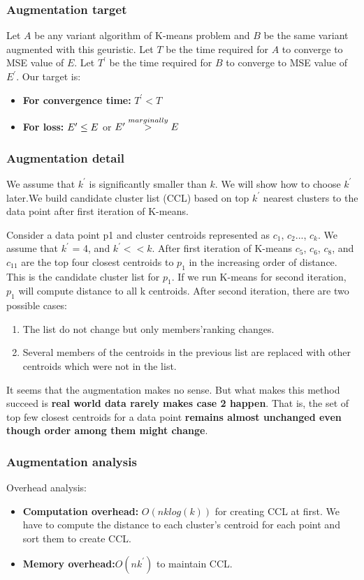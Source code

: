 \documentclass[11pt]{article}
\begin{document}
\subsubsection{Augmentation target}
Let $A$ be any variant algorithm of K-means problem and $B$ be the same variant augmented with this geuristic. Let $T$ be the time required for $A$ to converge to MSE value of $E$. Let $T^{\prime}$ be the time required for $B$ to converge to MSE value of $E^{\prime}$. Our target is:
\begin{itemize}
\item \textbf{For convergence time:} $T^{\prime} < T$
\item \textbf{For loss:} $E^{\prime} \le E \space $ or $ \space E^{\prime} \overset{marginally}{>} E$
\end{itemize}

\subsubsection{Augmentation detail}
\par We assume that $k^{\prime}$ is significantly smaller than $k$. We will show how to choose $k^{\prime}$ later.We build candidate cluster list (CCL) based on top $k^{\prime}$ nearest clusters to the data point after first iteration of K-means. \par

Consider a data point p1 and cluster centroids represented as $c_1$, $c_2$..., $c_k$. We assume that $k^{\prime}$ = 4, and $k^{\prime} << k $. After first iteration of K-means $c_5$, $c_6$, $c_8$, and $c_{11}$ are the top four closest centroids to $p_1$ in the increasing order of distance. This is the candidate cluster list for $p_1$. If we run K-means for second iteration, $p_1$ will compute distance to all k centroids. After second iteration, there are two possible cases:
\begin{enumerate}
\item The list do not change but only members'ranking changes.
\item Several members of the centroids in the previous list are replaced with other centroids which were not in the list.
\end{enumerate}
It seems that the augmentation makes no sense. But what makes this method succeed is \textbf{real world data rarely makes case 2 happen}. That is, the set of top few closest centroids for a data point \textbf{remains almost unchanged even though order among them might change}.
\subsubsection{Augmentation analysis}
Overhead analysis:
\begin{itemize}
\item \textbf{Computation overhead:} $O(nklog(k))$ for creating CCL at first. We have to compute the distance to each cluster's centroid for each point and sort them to create CCL. 
\item \textbf{Memory overhead:}$ O(nk^{\prime})$ to maintain CCL.
\end{itemize}
\par
\end{document}
